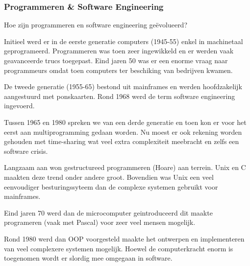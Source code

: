 \documentclass[../main.tex]{subfiles}
\begin{document}
\subsubsection{Programmeren \& Software Engineering}
\begin{question}
Hoe zijn programmeren en software engineering ge\"evolueerd?
\end{question}
\begin{solution}
	Initieel werd er in de eerste generatie computers (1945-55) enkel in machinetaal geprogrameerd.
	Programmeren was toen zeer ingewikkeld en er werden vaak geavanceerde trucs toegepast.
	Eind jaren 50 was er een enorme vraag naar programmeurs omdat toen computers ter beschiking van bedrijven kwamen.

	De tweede generatie (1955-65) bestond uit mainframes en werden hoofdzakelijk aangestuurd met ponskaarten.
	Rond 1968 werd de term software engineering ingevoerd.

	Tussen 1965 en 1980 spreken we van een derde generatie en toen kon er voor het eerst aan multiprogramming gedaan worden.
	Nu moest er ook rekening worden gehouden met time-sharing wat veel extra complexiteit meebracht en zelfs een software crisis.

	Langzaam aan won gestructureed programmeren (Hoare) aan terrein.
	Unix en C maakten deze trend onder andere groot.
	Bovendien was Unix een veel eenvoudiger besturingssyteem dan de complexe systemen gebruikt voor mainframes.

	Eind jaren 70 werd dan de microcomputer geintroduceerd dit maakte programeren (vaak met Pascal) voor zeer veel mensen mogelijk.

	Rond 1980 werd dan OOP voorgesteld maakte het ontwerpen en implementeren van veel complexere systemen mogelijk.
	Hoewel de computerkracht enorm is toegenomen wordt er slordig mee omgegaan in software.
\end{solution}
\end{document}
